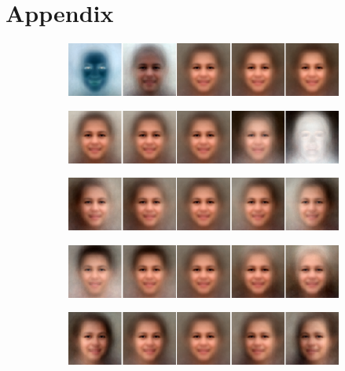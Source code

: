 \newpage
\appendix
\section{Appendix}

\begin{figure} [h!]
    \centering
    \begin{subfigure}[b]{\textwidth}
        \includegraphics[width=\textwidth]{fig/PCA/pca0}
   
    \end{subfigure}
    \begin{subfigure}[b]{\textwidth}
        \includegraphics[width=\textwidth]{fig/PCA/pca1}
       
    \end{subfigure}
    \begin{subfigure}[b]{\textwidth}
        \includegraphics[width=\textwidth]{fig/PCA/pca2}
       
    \end{subfigure}
    \begin{subfigure}[b]{\textwidth}
        \includegraphics[width=\textwidth]{fig/PCA/pca3}
       
    \end{subfigure}
    \begin{subfigure}[b]{\textwidth}
        \includegraphics[width=\textwidth]{fig/PCA/pca4}


\end{subfigure}
\end{figure}
